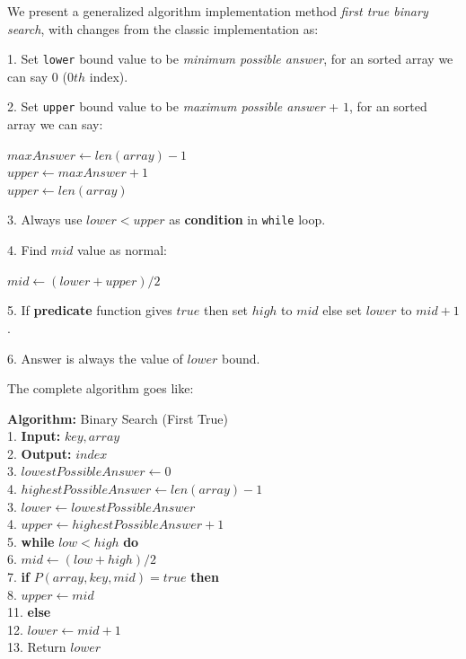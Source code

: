\documentclass[10pt,twocolumn]{article}
\begin{document}
	We present a generalized algorithm implementation method \emph{first true binary search}, with changes from the classic implementation as:
	
	\vspace{5pt}
	
	1. Set \texttt{lower} bound value to be \emph{minimum possible answer}, for an sorted array we can say $0$ ($0th$ index).
	
	2. Set \texttt{upper} bound value to be \emph{maximum possible answer} + $1$, for an sorted array we can say:
	
	\begin{center}
		
	\quad \(maxAnswer \gets len(array) - 1\) \\
	\quad \(upper \gets maxAnswer + 1\) \\ 
	\quad \(upper \gets len(array)\) \\		
	
	
	\end{center}
	
	3. Always use $lower < upper$ as \textbf{condition} in \texttt{while} loop.
	
	4. Find \(mid\) value as normal:
	
	\begin{center}
		$mid \gets (lower + upper) / 2$
	\end{center}
	

	5. If \textbf{predicate} function gives $true$ then set \(high\)  to \(mid\) else set \(lower\) to \(mid + 1\).
	
	6. Answer is always the value of \(lower\) bound.
	
	\vspace*{5pt}
	
	The complete algorithm goes like:
	
	\vspace*{10pt}
	
	\noindent
	\textbf{Algorithm:} Binary Search (First True)\\
	1. \textbf{Input:} \(key, array\) \\
	2. \textbf{Output:} \(index\) \\
	3. \(lowestPossibleAnswer \gets 0\) \\
	4. \(highestPossibleAnswer \gets len(array) - 1\) \\
	3. \(lower \gets lowestPossibleAnswer\) \\
	4. \(upper \gets highestPossibleAnswer + 1\) \\
	5. \textbf{while} \(low < high\) \textbf{ do} \\
	6. \quad\(mid \gets (low + high) / 2\) \\
	7. \quad \textbf{if} \(P(array, key, mid) = true \) \textbf{ then} \\
	8. \quad \quad \(upper \gets mid\) \\
	11. \quad \textbf{else} \\
	12. \quad \quad \(lower \gets mid + 1\) \\
	13. Return \(lower\)
	
\end{document}
